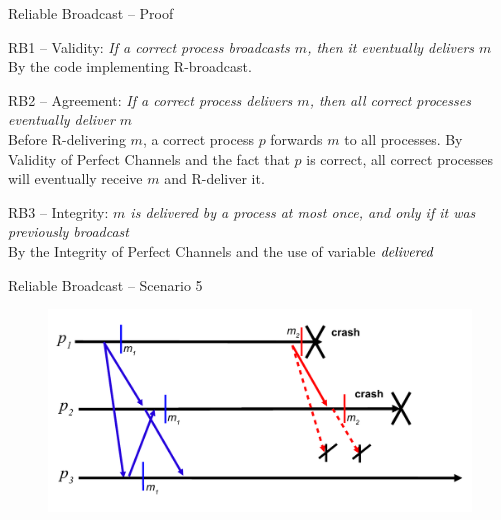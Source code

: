 \begin{frame}{Reliable Broadcast -- Proof}


\BIL
\item \alert{RB1 -- Validity}: \emph{If a correct process broadcasts $m$, then it eventually delivers $m$}\\
By the code implementing R-broadcast.
\item \alert{RB2 -- Agreement}: \emph{If a correct process delivers $m$, then all correct processes eventually deliver $m$}\\
Before R-delivering $m$, a correct process $p$ forwards $m$ to all processes. 
By Validity of Perfect Channels and the fact that $p$ is correct, all correct processes will eventually receive $m$ and R-deliver it.
\item \alert{RB3 -- Integrity}: \emph{$m$ is delivered by a process at most once, and only if it was previously broadcast}\\
By the Integrity of Perfect Channels and the use of variable $\textit{delivered}$
\EIL

\end{frame}

\begin{frame}{Reliable Broadcast -- Scenario 5}


\begin{figure}
\includegraphics[width=\textwidth]{figs/04/rb-scenario5}
\end{figure}


\end{frame}

